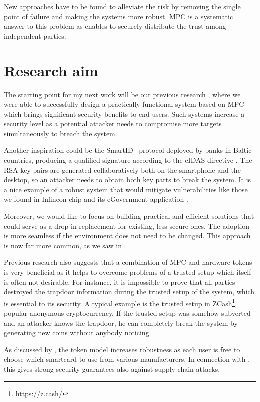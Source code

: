 \documentclass[
  digital, %
  twoside, %
  table,   %
  lof,     %
  lot,     %
]{fithesis3}
\newcounter{ph4_show_guides}
\theoremstyle{definition}
\theoremstyle{remark}
\begin{document}
New approaches have to be found to alleviate the risk by removing the single point of failure and making the systems more robust. MPC is a systematic answer to this problem as enables to securely distribute the trust among independent parties.

\section{Research aim}
The starting point for my next work will be our previous research \cite{2017-ccs-mavroudis}, where we were able to successfully design a practically functional system based on MPC which brings significant security benefits to end-users. Such systems increase a security level as a potential attacker needs to compromise more targets simultaneously to breach the system. 

Another inspiration could be the SmartID~\cite{smart_id_ee} protocol deployed by banks in Baltic countries, producing a qualified signature according to the eIDAS directive \cite{eidas2016}. The RSA key-pairs are generated collaboratively both on the smartphone and the desktop, so an attacker needs to obtain both key parts to break the system. It is a nice example of a robust system that would mitigate vulnerabilities like those we found in Infineon chip and its eGovernment application \cite{2017-ccs-nemec}. 

Moreover, we would like to focus on building practical and efficient solutions that could serve as a drop-in replacement for existing, less secure ones. 
The adoption is more seamless if the environment does not need to be changed.
This approach is now far more common, as we saw in \cite{smart_id_ee, DCMBR18}. %

Previous research also suggests that a combination of MPC and hardware tokens is very beneficial as it helps to overcome problems of a trusted setup which  itself is often not desirable. For instance, it is impossible to prove that all parties destroyed the trapdoor information during the trusted setup of the system, which is essential to its security. A typical example is the trusted setup in ZCash\footnote{\url{https://z.cash/}}, popular anonymous cryptocurrency. If the trusted setup was somehow subverted and an attacker knows the trapdoor, he can completely break the system by generating new coins without anybody noticing.

As discussed by \cite{K07}, the token model increases robustness as each user is free to choose which smartcard to use from various manufacturers. In connection with \cite{2017-ccs-nemec}, this gives strong security guarantees also against supply chain attacks.
\end{document}
